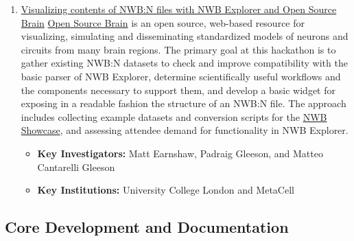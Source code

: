 \documentclass{article}
\begin{document}
\begin{enumerate}
    \item \href{https://neurodatawithoutborders.github.io/nwb_hackathons/HCK06_2019_Janelia/projects/OSB_NWB_Explorer/}{Visualizing contents of NWB:N files with NWB Explorer and Open Source Brain} \href{http://opensourcebrain.org/}{Open Source Brain} is an open source, web-based resource for visualizing, simulating and disseminating standardized models of neurons and circuits from many brain regions. The primary goal at this hackathon is to gather existing NWB:N datasets to check and improve compatibility with the basic parser of NWB Explorer, determine scientifically useful workflows and the components necessary to support them, and develop a basic widget for exposing in a readable fashion the structure of an NWB:N file. The approach includes collecting example datasets and conversion scripts for the \href{https://github.com/OpenSourceBrain/NWBShowcase}{NWB Showcase}, and assessing attendee demand for functionality in NWB Explorer. 
        \vspace{-0.2cm}
        \begin{itemize}[noitemsep]
            \item \textbf{Key Investigators:} Matt Earnshaw, Padraig Gleeson, and Matteo Cantarelli Gleeson
            \item \textbf{Key Institutions:} University College London and MetaCell
        \end{itemize}
        
    \setcounter{projectEnumCounter}{\theenumi}
\end{enumerate}


\subsection{Core Development and Documentation}
\end{document}
